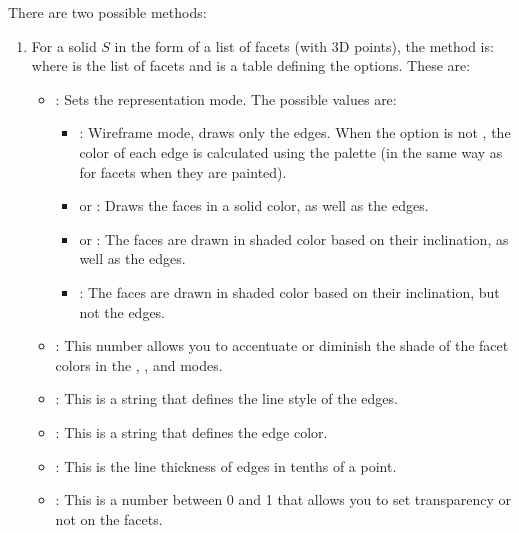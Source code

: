 There are two possible methods:
\begin{enumerate}
    \item For a solid $S$ in the form of a list of facets (with 3D points), the method is:
where  is the list of facets and  is a table defining the options. These are:
    \begin{itemize}
        \item {}: Sets the representation mode. The possible values are:
            \begin{itemize}
                \item {}: Wireframe mode, draws only the edges. When the  option is not \nil, the color of each edge is calculated using the palette (in the same way as for facets when they are painted).
                
                \item {} or : Draws the faces in a solid color, as well as the edges.   
                  
                \item {} or : The faces are drawn in shaded color based on their inclination, as well as the edges.
                
                \item {}: The faces are drawn in shaded color based on their inclination, but not the edges.
            \end{itemize}
        \item {}: This number allows you to accentuate or diminish the shade of the facet colors in the , , and  modes.
        
        \item {}: This is a string that defines the line style of the edges.
        
        \item {}: This is a string that defines the edge color.
        
        \item {}: This is the line thickness of edges in tenths of a point.
        
        \item {} : This is a number between 0 and 1 that allows you to set transparency or not on the facets.
        

\end{itemize}
\end{enumerate}
